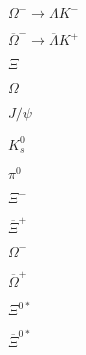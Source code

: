 \documentclass{article}
\begin{document}
$\Omega^-\rightarrow \Lambda K^-$
\pagebreak

$\overline{\Omega}^-\rightarrow \overline{\Lambda} K^+$
\pagebreak

$\Xi$
\pagebreak

$\Omega$
\pagebreak

$J/\psi$
\pagebreak

$K^0_s$
\pagebreak

$\pi^0$
\pagebreak

$\Xi^-$
\pagebreak

$\overline{\Xi}^+$
\pagebreak

$\Omega^-$
\pagebreak

$\overline{\Omega}^+$
\pagebreak

$\Xi^{0*}$
\pagebreak

$\overline{\Xi}^{0*}$
\pagebreak
\end{document}
